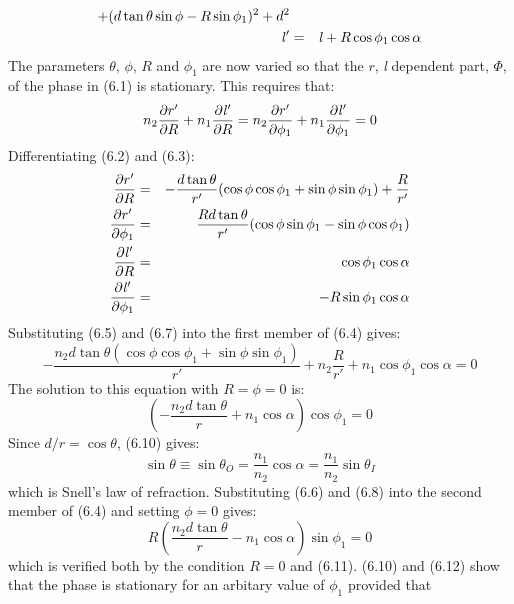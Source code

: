 \documentclass [12pt]{article}
\begin{document}
{\begin{eqnarray}
      + (d \tan \theta \sin \phi -R \sin \phi_1)^2+d^2 \\
   {\it l}' & = &  {\it l} +R \cos \phi_1 \cos \alpha
  \end{eqnarray}
    The parameters $\theta$, $\phi$, $R$ and $\phi_1$ are now varied so that the $r$, {\it l}
 dependent part, $\Phi$, of the phase in (6.1) is stationary. This requires that:
   \begin{equation}
  n_2 \frac{\partial r'}{\partial R}+ n_1\frac{\partial {\it l}' }{\partial R}
  =   n_2\frac{\partial r'}{\partial \phi_1}+ n_1\frac{\partial {\it l}' }{\partial \phi_1} = 0
  \end{equation}  
  Differentiating (6.2) and (6.3):
  \begin{eqnarray}
   \frac{\partial  r'}{\partial  R}  & = &  -\frac{d \tan \theta}{r'}(\cos \phi \cos \phi_1+ \sin \phi \sin \phi_1)
    +\frac{R}{r'} \\
  \frac{\partial  r'}{\partial \phi_1}  & = &  \frac{R d \tan \theta}{r'}(\cos \phi \sin \phi_1
    - \sin \phi \cos \phi_1) \\
  \frac{\partial {\it l}' }{\partial  R}  & = &   \cos \phi_1 \cos \alpha  \\
 \frac{\partial {\it l}' }{\partial \phi_1}  & = &   -R \sin \phi_1 \cos \alpha 
  \end{eqnarray} 
   Substituting (6.5) and (6.7) into the first member of (6.4) gives:
   \begin{equation}
  -\frac{n_2 d \tan \theta (\cos \phi \cos \phi_1+ \sin \phi \sin \phi_1)}{r'} + n_2 \frac{R}{r'}
   + n_1 \cos \phi_1 \cos \alpha = 0
 \end{equation}
  The solution to this equation with $R= \phi = 0$ is:
   \begin{equation}
  (-\frac{n_2 d \tan \theta }{r} + n_1 \cos \alpha) \cos \phi_1  = 0
 \end{equation}
 Since $d/r = \cos \theta$, (6.10) gives:
  \begin{equation}
   \sin \theta \equiv \sin \theta_O = \frac {n_1}{n_2} \cos \alpha =  \frac {n_1}{n_2} \sin \theta_I
\end{equation}
 which is Snell's law of refraction.
 Substituting (6.6) and (6.8) into the second member of (6.4) and setting $\phi = 0$ gives:
 \begin{equation}
  R(\frac{n_2 d \tan \theta }{r}- n_1 \cos \alpha) \sin \phi_1 = 0
\end{equation}
 which is verified both by the condition $R = 0$ and (6.11). (6.10) and (6.12) 
  show that the phase is stationary for an arbitary value of $\phi_1$ provided that 
}
\end{document}
